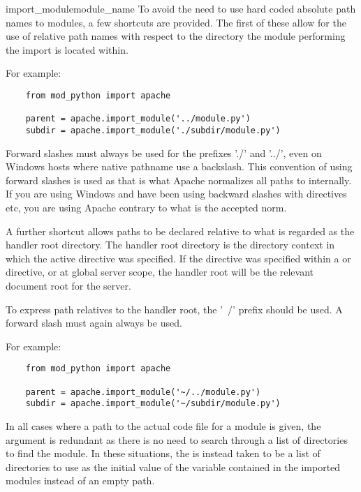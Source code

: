 \begin{funcdesc}{import_module}{module_name}
  To avoid the need to use hard coded absolute path names to modules, a few
  shortcuts are provided. The first of these allow for the use of relative
  path names with respect to the directory the module performing the
  import is located within.

  For example:

  \begin{verbatim}
    from mod_python import apache

    parent = apache.import_module('../module.py')
    subdir = apache.import_module('./subdir/module.py')
  \end{verbatim}

  Forward slashes must always be used for the prefixes './' and '../', even
  on Windows hosts where native pathname use a backslash. This convention
  of using forward slashes is used as that is what Apache normalizes all
  paths to internally. If you are using Windows and have been using
  backward slashes with  directives etc, you are using
  Apache contrary to what is the accepted norm.

  A further shortcut allows paths to be declared relative to what is
  regarded as the handler root directory. The handler root directory is the
  directory context in which the active  directive was
  specified. If the directive was specified within a  or
   directive, or at global server scope, the handler root
  will be the relevant document root for the server.
  
  To express path relatives to the handler root, the '~/' prefix should be
  used. A forward slash must again always be used.

  For example:

  \begin{verbatim}
    from mod_python import apache

    parent = apache.import_module('~/../module.py')
    subdir = apache.import_module('~/subdir/module.py')
  \end{verbatim}

  In all cases where a path to the actual code file for a module is given,
  the  argument is redundant as there is no need to search
  through a list of directories to find the module. In these situations,
  the  is instead taken to be a list of directories to use as the
  initial value of the  variable contained in the
  imported modules instead of an empty path.


\end{funcdesc}
